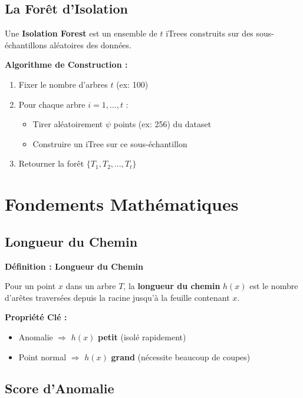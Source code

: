 \documentclass[a4paper,11pt]{article}
\begin{document}
\subsection{La Forêt d'Isolation}

Une \textbf{Isolation Forest} est un ensemble de $t$ iTrees construits sur des sous-échantillons aléatoires des données.

\begin{examplebox}
\textbf{Algorithme de Construction :}
\begin{enumerate}
    \item Fixer le nombre d'arbres $t$ (ex: 100)
    \item Pour chaque arbre $i = 1, \ldots, t$ :
    \begin{itemize}
        \item Tirer aléatoirement $\psi$ points (ex: 256) du dataset
        \item Construire un iTree sur ce sous-échantillon
    \end{itemize}
    \item Retourner la forêt $\{T_1, T_2, \ldots, T_t\}$
\end{enumerate}
\end{examplebox}

\section{Fondements Mathématiques}

\subsection{Longueur du Chemin}

\begin{mathbox}
\textbf{Définition : Longueur du Chemin}

Pour un point $x$ dans un arbre $T$, la \textbf{longueur du chemin} $h(x)$ est le nombre d'arêtes traversées depuis la racine jusqu'à la feuille contenant $x$.

\textbf{Propriété Clé :}
\begin{itemize}
    \item Anomalie $\Rightarrow$ $h(x)$ \textbf{petit} (isolé rapidement)
    \item Point normal $\Rightarrow$ $h(x)$ \textbf{grand} (nécessite beaucoup de coupes)
\end{itemize}
\end{mathbox}

\subsection{Score d'Anomalie}
\end{document}
